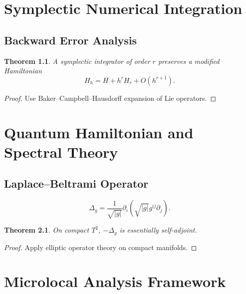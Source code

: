 \documentclass{book}
\newtheorem{theorem}{Theorem}[chapter]
\begin{document}

\chapter{Symplectic Numerical Integration}

\section{Backward Error Analysis}

\begin{theorem}
A symplectic integrator of order $r$ preserves a modified Hamiltonian
\[
H_h = H + h^r H_r + O(h^{r+1}).
\]
\end{theorem}

\begin{proof}
Use Baker–Campbell–Hausdorff expansion of Lie operators.
\end{proof}


\chapter{Quantum Hamiltonian and Spectral Theory}

\section{Laplace--Beltrami Operator}

\[
\Delta_g = \frac1{\sqrt{|g|}}
\partial_i (\sqrt{|g|} g^{ij}\partial_j).
\]

\begin{theorem}
On compact $T^2$, $-\Delta_g$ is essentially self-adjoint.
\end{theorem}

\begin{proof}
Apply elliptic operator theory on compact manifolds.
\end{proof}


\chapter{Microlocal Analysis Framework}
\end{document}
